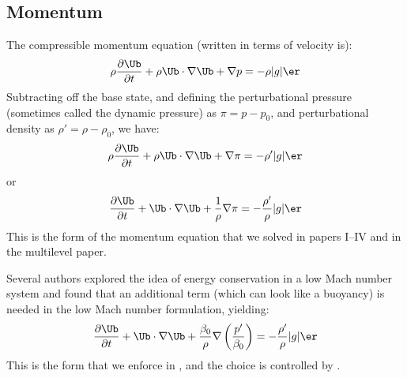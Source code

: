 \subsection{Momentum}

The compressible momentum equation (written in terms of velocity is):
\begin{equation}
\rho \frac{\partial \Ub}{\partial t} + \rho \Ub \cdot \nabla \Ub + \nabla p = -\rho |g| \er
\end{equation}
Subtracting off the base state, and defining the perturbational
pressure (sometimes called the dynamic pressure) as $\pi = p - p_0$,
and perturbational density as $\rho' = \rho - \rho_0$, we have:
\begin{equation}
\rho \frac{\partial \Ub}{\partial t} + \rho \Ub \cdot \nabla \Ub + \nabla \pi = -\rho' |g| \er
\end{equation}
or
\begin{equation}
\frac{\partial \Ub}{\partial t} + \Ub \cdot \nabla \Ub + \frac{1}{\rho} \nabla \pi =
   -\frac{\rho^\prime}{\rho} |g| \er
\end{equation}
This is the form of the momentum equation that we solved in papers
I--IV and in the multilevel paper.

Several authors \cite{KP:2012,VLBWZ:2013} explored the idea of energy
conservation in a low Mach number system and found that an additional
term (which can look like a buoyancy) is needed in the low Mach number
formulation, yielding:
\begin{equation}
\frac{\partial \Ub}{\partial t} + \Ub \cdot \nabla \Ub +
   \frac{\beta_0}{\rho} \nabla \left (\frac{p^\prime}{\beta_0} \right ) =
   -\frac{\rho^\prime}{\rho} |g| \er
\end{equation}
This is the form that we enforce in \maestro, and the choice is controlled
by .

